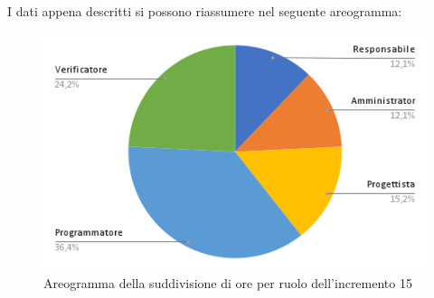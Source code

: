 \pagebreak
I dati appena descritti si possono riassumere nel seguente areogramma:
\begin{figure}[!h]
    \vspace{5px}
    \includegraphics[scale=0.5]{../../../Images/Diagrammi/Diagramma a torta/areogrammaIncremento15.png}
    \centering
    \caption{Areogramma della suddivisione di ore per ruolo dell'incremento 15}
\end{figure}

